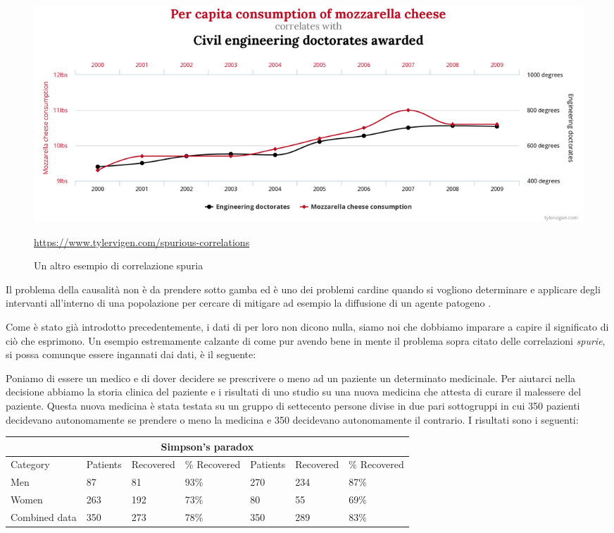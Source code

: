 \begin{figure}[h]
    \begin{center}
        \includegraphics[width=\linewidth]{img/chart1.png}
        \caption{Un altro esempio di correlazione spuria}
        \url{https://www.tylervigen.com/spurious-correlations}
        \label{fig:another_spurious_relations}
    \end{center}
\end{figure}

\newpage

Il problema della causalità non è da prendere sotto gamba
ed è uno dei problemi cardine quando si vogliono determinare e 
applicare degli intervanti all'interno di una popolazione per
cercare di mitigare ad esempio la diffusione di un agente 
patogeno \cite{Parascandola2001-kw}. 

Come è stato già introdotto precedentemente, i dati di per loro
non dicono nulla, siamo noi che dobbiamo imparare a 
capire il significato di ciò che esprimono. Un esempio 
estremamente calzante di come pur avendo bene in mente il
problema sopra citato delle correlazioni \emph{spurie}, si
possa comunque essere ingannati dai dati, è il seguente:

Poniamo di essere un medico e di dover decidere se 
prescrivere o meno ad un paziente un determinato medicinale.
Per aiutarci nella decisione abbiamo la storia clinica
del paziente e i risultati di uno studio su una nuova 
medicina che attesta di curare il malessere del paziente.
Questa nuova medicina è stata testata su un gruppo di 
settecento persone divise in due pari sottogruppi in cui 
350 pazienti decidevano autonomamente se prendere o meno 
la medicina e 350 decidevano autonomamente il contrario.
I risultati sono i seguenti:

\begin{tabular}{ |p{}||p{}|p{}|p{}||p{}|p{}|p{}|  }
	\hline
	\multicolumn{7}{|c|}{Simpson's paradox} \\
	\hline
	Category & Patients & Recovered & \% Recovered & Patients & Recovered & \% Recovered\\
	\hline
	Men & 87 & 81 & 93\% & 270 & 234 & 87\% \\
	Women & 263 & 192 & 73\% & 80 & 55 & 69\% \\
    Combined data & 350 & 273 & 78\% & 350 & 289 & 83\% \\
	\hline
\end{tabular}

